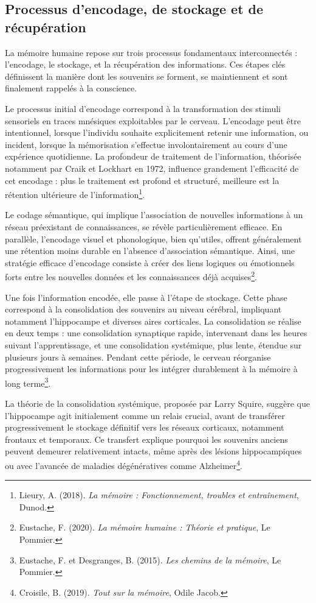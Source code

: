 \documentclass[11pt,a4paper]{report}
\begin{document}
\newpage
\subsection{Processus d’encodage, de stockage et de récupération}
La mémoire humaine repose sur trois processus fondamentaux interconnectés : l'encodage, le stockage, et la récupération des informations. Ces étapes clés définissent la manière dont les souvenirs se forment, se maintiennent et sont finalement rappelés à la conscience.

Le processus initial d'encodage correspond à la transformation des stimuli sensoriels en traces mnésiques exploitables par le cerveau. L'encodage peut être intentionnel, lorsque l'individu souhaite explicitement retenir une information, ou incident, lorsque la mémorisation s'effectue involontairement au cours d'une expérience quotidienne. La profondeur de traitement de l'information, théorisée notamment par Craik et Lockhart en 1972, influence grandement l’efficacité de cet encodage : plus le traitement est profond et structuré, meilleure est la rétention ultérieure de l'information\footnote{Lieury, A. (2018). \textit{La mémoire : Fonctionnement, troubles et entraînement}, Dunod.}.

Le codage sémantique, qui implique l'association de nouvelles informations à un réseau préexistant de connaissances, se révèle particulièrement efficace. En parallèle, l'encodage visuel et phonologique, bien qu'utiles, offrent généralement une rétention moins durable en l'absence d'association sémantique. Ainsi, une stratégie efficace d'encodage consiste à créer des liens logiques ou émotionnels forts entre les nouvelles données et les connaissances déjà acquises\footnote{Eustache, F. (2020). \textit{La mémoire humaine : Théorie et pratique}, Le Pommier.}.

Une fois l’information encodée, elle passe à l'étape de stockage. Cette phase correspond à la consolidation des souvenirs au niveau cérébral, impliquant notamment l'hippocampe et diverses aires corticales. La consolidation se réalise en deux temps : une consolidation synaptique rapide, intervenant dans les heures suivant l'apprentissage, et une consolidation systémique, plus lente, étendue sur plusieurs jours à semaines. Pendant cette période, le cerveau réorganise progressivement les informations pour les intégrer durablement à la mémoire à long terme\footnote{Eustache, F. et Desgranges, B. (2015). \textit{Les chemins de la mémoire}, Le Pommier.}.

La théorie de la consolidation systémique, proposée par Larry Squire, suggère que l'hippocampe agit initialement comme un relais crucial, avant de transférer progressivement le stockage définitif vers les réseaux corticaux, notamment frontaux et temporaux. Ce transfert explique pourquoi les souvenirs anciens peuvent demeurer relativement intacts, même après des lésions hippocampiques ou avec l’avancée de maladies dégénératives comme Alzheimer\footnote{Croisile, B. (2019). \textit{Tout sur la mémoire}, Odile Jacob.}.
\end{document}
